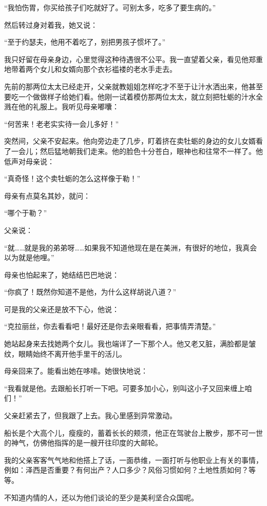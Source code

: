 \documentclass[12pt,UTF-8,openany]{ctexbook}
\begin{document}
\begin{normalsize}
    “我怕伤胃，你买给孩子们吃就好了。可别太多，吃多了要生病的。”
    
    然后转过身对着我，她又说：
    
    “至于约瑟夫，他用不着吃了，别把男孩子惯坏了。”
    
    我只好留在母亲身边，心里觉得这种待遇很不公平。我一直望着父亲，看见他郑重地带着两个女儿和女婿向那个衣衫褴褛的老水手走去。
    
    先前的那两位太太已经走开，父亲就教姐姐怎样吃才不至于让汁水洒出来，他甚至要吃一个做做样子给她们看。他刚一试着模仿那两位太太，就立刻把牡蛎的汁水全溅在他的礼服上。我听见母亲嘟囔：
    
    “何苦来！老老实实待一会儿多好！”
    
    突然间，父亲不安起来。他向旁边走了几步，盯着挤在卖牡蛎的身边的女儿女婿看了一会儿；然后猛地朝我们走来。他的脸色十分苍白，眼神也和往常不一样了。他低声对母亲说：
    
    “真奇怪！这个卖牡蛎的怎么这样像于勒！”
    
    母亲有点莫名其妙，就问：
    
    “哪个于勒？”
    
    父亲说：
    
    “就……就是我的弟弟呀……如果我不知道他现在是在美洲，有很好的地位，我真会以为就是他哩。”
    
    母亲也怕起来了，她结结巴巴地说：
    
    “你疯了！既然你知道不是他，为什么这样胡说八道？”
    
    可是我的父亲还是放不下心，他说：
    
    “克拉丽丝，你去看看吧！最好还是你去亲眼看看，把事情弄清楚。”
    
    她站起身来去找她两个女儿。我也端详了一下那个人。他又老又脏，满脸都是皱纹，眼睛始终不离开他手里干的活儿。
    
    母亲回来了。能看出她在哆嗦。她很快地说：
    
    “我看就是他。去跟船长打听一下吧。可要多加小心，别叫这小子又回来缠上咱们！”
    
    父亲赶紧去了，但我跟了上去。我心里感到异常激动。
    
    船长是个大高个儿，瘦瘦的，蓄着长长的颊须，他正在驾驶台上散步，那不可一世的神气，仿佛他指挥的是一艘开往印度的大邮轮。
    
    我的父亲客客气气地和他搭上了话，一面恭维，一面打听与他职业上有关的事情，例如：泽西是否重要？有何出产？人口多少？风俗习惯如何？土地性质如何？等等。
    
    不知道内情的人，还以为他们谈论的至少是美利坚合众国呢。
    

\end{normalsize}
\end{document}
